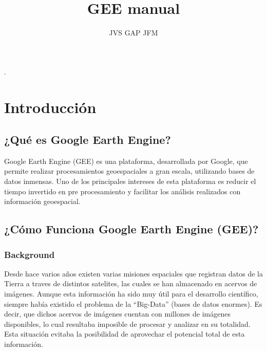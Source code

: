 \documentclass[
]{article}
\title{GEE manual}
\author{JVS GAP JFM}
\date{}
\begin{document}
\maketitle

{
\setcounter{tocdepth}{3}
\tableofcontents
}
\setlength{\aweboxleftmargin}{0.1\linewidth}.
\setlength{\aweboxcontentwidth}{0.85\linewidth}
\setlength{\aweboxvskip}{6mm}
\setlength{\aweboxrulewidth}{5pt}

\newpage

\hypertarget{introducciuxf3n}{%
\section{Introducción}\label{introducciuxf3n}}

\hypertarget{quuxe9-es-google-earth-engine}{%
\subsection{¿Qué es Google Earth
Engine?}\label{quuxe9-es-google-earth-engine}}

Google Earth Engine (GEE) es una plataforma, desarrollada por Google,
que permite realizar procesamientos geoespaciales a gran escala,
utilizando bases de datos inmensas. Uno de los principales intereses de
esta plataforma es reducir el tiempo invertido en pre procesamiento y
facilitar los análisis realizados con información geoespacial.

\hypertarget{cuxf3mo-funciona-google-earth-engine-gee}{%
\subsection{¿Cómo Funciona Google Earth Engine
(GEE)?}\label{cuxf3mo-funciona-google-earth-engine-gee}}

\hypertarget{background}{%
\subsubsection{Background}\label{background}}

Desde hace varios años existen varias misiones espaciales que registran
datos de la Tierra a traves de distintos satelites, las cuales se han
almacenado en acervos de imágenes. Aunque esta información ha sido muy
útil para el desarrollo científico, siempre había existido el problema
de la ``Big-Data'' (bases de datos enormes). Es decir, que dichos
acervos de imágenes cuentan con millones de imágenes disponibles, lo
cual resultaba imposible de procesar y analizar en su totalidad. Esta
situación evitaba la posibilidad de aprovechar el potencial total de
esta información.
\end{document}
